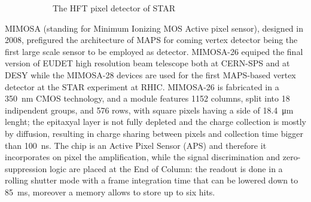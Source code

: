 \begin{figure}
\begin{subfigure}[b]{0.49\textwidth}
                \caption{The HFT pixel detector of STAR}
                \label{fig:HFT}
            \end{subfigure}
            \caption{}
            \label{fig:EUDET_STAR}
       \end{figure}
        MIMOSA \cite{MIMOSA}\cite{MIMOSA26} (standing for Minimum Ionizing MOS Active pixel sensor), designed in 2008, prefigured the architecture of MAPS for coming vertex detector being the first large scale sensor to be employed as detector. MIMOSA-26 equiped the final version of EUDET high resolution  beam telescope both at CERN-SPS and at DESY while the MIMOSA-28 devices are used for the first MAPS-based vertex detector at the STAR experiment at RHIC.
        MIMOSA-26 is fabricated in a \SI{350}{nm} CMOS technology, and a module features 1152 columns, split into 18 indipendent groups, and 576 rows, with square pixels having a side of \SI{18.4}{\um} lenght; the epitaxyal layer is not fully depleted and the charge collection is mostly by diffusion, resulting in charge sharing between pixels and collection time bigger than \SI{100}{ns}.
        The chip is an Active Pixel Sensor (APS) and therefore it incorporates on pixel the amplification, while the signal discrimination and zero-suppression logic are placed at the End of Column: the readout is done in a rolling shutter mode with a frame integration time that can be lowered down to \SI{85}{ms}, moreover a memory allows to store up to six hits. 

